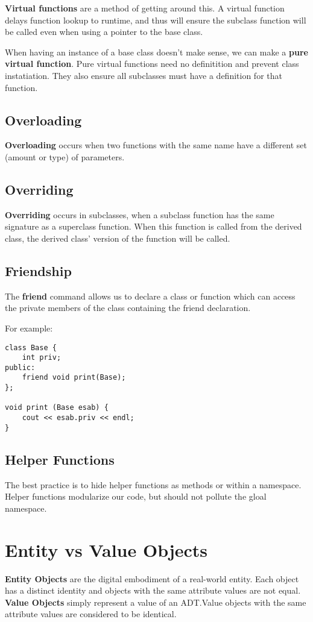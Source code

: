 \documentclass[12pt]{article}
\begin{document}
{\bf Virtual functions} are a method of getting around this. A virtual function delays function lookup to runtime, and thus will ensure the subclass function will be called even when using a pointer to the base class.

When having an instance of a base class doesn't make sense, we can make a {\bf pure virtual function}. Pure virtual functions need no definitition and prevent class instatiation. They also ensure all subclasses must have a definition for that function.

\subsection{Overloading}
{\bf Overloading} occurs when two functions with the same name have a different set (amount or type) of parameters.

\subsection{Overriding}
{\bf Overriding} occurs in subclasses, when a subclass function has the same signature as a superclass function. When this function is called from the derived class, the derived class' version of the function will be called.

\subsection{Friendship}
The {\bf friend} command allows us to declare a class or function which can access the private members of the class containing the friend declaration.

For example:
\begin{lstlisting}
class Base {
    int priv;
public:
    friend void print(Base);
};

void print (Base esab) {
    cout << esab.priv << endl;
}
\end{lstlisting}

\subsection{Helper Functions}
The best practice is to hide helper functions as  methods or within a namespace. Helper functions modularize our code, but should not pollute the gloal namespace.

\section{Entity vs Value Objects}
{\bf Entity Objects} are the digital embodiment of a real-world entity. Each object has a distinct identity and objects with the same attribute values are not equal. {\bf Value Objects} simply represent a value of an ADT.\@ Value objects with the same attribute values are considered to be identical.
\end{document}

